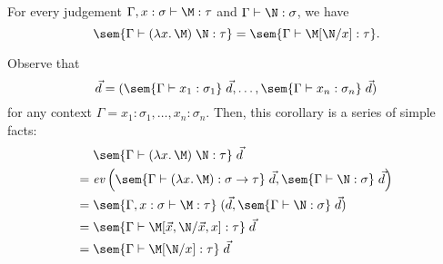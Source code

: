 %
\begin{frame}
  \begin{corollary}[Application]
    For every judgement $\Gamma, x : \sigma \vdash \M : \tau$
    and $\Gamma \vdash \N : \sigma$, we have
    \[
      \sem{\Gamma \vdash (\lambda x.\,\M)\;\N : \tau}
      = \sem{\Gamma \vdash \M[\N/x] : \tau}.
    \]
  \end{corollary}
  Observe that
  \[
    \vec{d} = (\sem{\Gamma \vdash x_1 : \sigma_1}\;\vec{d}, \ldots,
  \sem{\Gamma \vdash x_n : \sigma_n}\;\vec{d})
  \]
  for any context $\Gamma = x_1 : \sigma_1, \ldots, x_n : \sigma_n$. Then, this
  corollary is a series of simple facts:
    \begin{align*}
          & \sem{\Gamma \vdash (\lambda x.\,\M)\; \N : \tau}\;\vec{d} \\
      ={} &
        \mathit{ev}
        \left(
          \sem{\Gamma \vdash (\lambda x.\, \M) : \sigma\to\tau}\;\vec{d},
          \sem{\Gamma \vdash \N : \sigma}\;\vec{d}
        \right) \\
        ={} & 
        \sem{\Gamma, x : \sigma \vdash \M : \tau}\;
        (\vec{d}, \sem{\Gamma \vdash \N : \sigma}\;\vec{d}) \\
        ={} &
        \sem{\Gamma \vdash \M[ \vec{x}, \N / \vec{x}, x] : \tau}\;\vec{d} \\
        ={} & 
        \sem{\Gamma \vdash \M[\N / x ] : \tau}\;\vec{d}
    \end{align*}
\end{frame}

